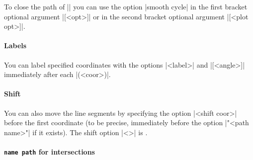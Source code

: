 To close the path of |\tzplot| you can use the option |smooth cycle| in the first bracket optional argument |[<opt>]| or in the second bracket optional argument |[<plot opt>]|.

\begin{tzcode}{.3}
\end{tzcode}



\paragraph{Labels} You can label specified coordinates with the options |{<label>}| and |[<angle>]| immediately after each |(<coor>)|.

\begin{tzcode}{.3}
\end{tzcode}

\paragraph{Shift} You can also move the line segments by specifying the option |<shift coor>| before the first coordinate (to be precise, immediately before the option |"<path name>"| if it exists).
The  shift option |<>| is .

\begin{tzcode}{.3}
\end{tzcode}

\paragraph{\texttt{name path} for intersections}

